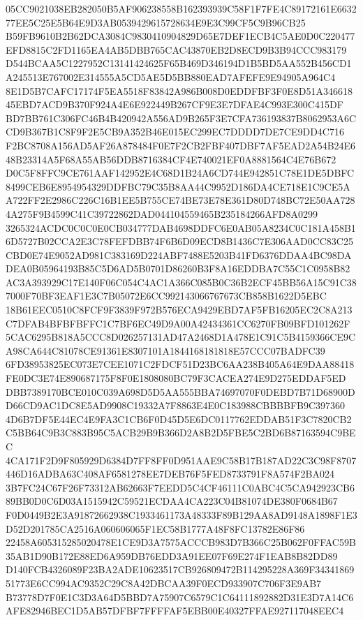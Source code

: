 \documentclass[UTF8,fontset=fandol,zihao=-4,a4paper]{ctexart}
\begin{document}
{{05CC9021038EB282050B5AF906238558B162393939C58F1F7FE4C89172161E663277EE5C25E5B64E9D3AB0539429615728634E9E3C99CF5C9B96CB25
B59FB9610B2B62DCA3084C9830410904829D65E7DEF1ECB4C5AE0D0C220477EFD8815C2FD1165EA4AB5DBB765CAC43870EB2D8ECD9B3B94CCC983179
D544BCAA5C1227952C13141424625F65B469D346194D1B5BD5AA552B456CD1A245513E767002E314555A5CD5AE5D5BB880EAD7AFEFE9E94905A964C4
8E1D5B7CAFC17174F5EA5518F83842A986B008D0EDDFBF3F0E8D51A34661845EBD7ACD9B370F924A4E6E922449B267CF9E3E7DFAE4C993E300C415DF
BD7BB761C306FC46B4B420942A556AD9B265F3E7CFA736193837B8062953A6CCD9B367B1C8F9F2E5CB9A352B46E015EC299EC7DDDD7DE7CE9DD4C716
F2BC8708A156AD5AF26A878484F0E7F2CB2FBF407DBF7AF5EAD2A54B24E648B23314A5F68A55AB56DDB8716384CF4E740021EF0A8881564C4E76B672
D0C5F8FFC9CE761AAF142952E4C68D1B24A6CD744E942851C78E1DE5DBFC8499CEB6E8954954329DDFBC79C35B8AA44C9952D186DA4CE718E1C9CE5A
A722FF2E2986C226C16B1EE5B755CE74BE73E78E361D80D748BC72E50AA7284A275F9B4599C41C39722862DAD044104559465B235184266AFD8A0299
3265324ACDC0C0C0E0CB034777DAB4698DDFC6E0AB05A8234C0C181A458B16D5727B02CCA2E3C78FEFDBB74F6B6D09ECD8B1436C7E306AAD0CC83C25
CBD0E74E9052AD981C383169D224ABF7488E5203B41FD6376DDAA4BC98DADEA0B05964193B85C5D6AD5B0701D86260B3F8A16EDDBA7C55C1C0958B82
AC3A393929C17E140F06C054C4AC1A366C085B0C36B2ECF45BB56A15C91C387000F70BF3EAF1E3C7B05072E6CC992143066767673CB858B1622D5EBC
18B61EEC0510C8FCF9F3839F972B576ECA9429EBD7AF5FB16205EC2C8A213C7DFAB4BFBFBFFC1C7BF6EC49D9A00A42434361CC6270FB09BFD101262F
5CAC6295B818A5CCC8D026257131AD47A2468D1A478E1C91C5B4159366CE9CA98CA644C81078CE91361E8307101A1844168181818E57CCC07BADFC39
6FD38953825EC073E7CEE1071C2FDCF51D23BC6AA238B405A64E9DAA88418FE0DC3E74E890687175F8F0E1808080BC79F3CACEA274E9D275EDDAF5ED
DBB7389170BCE010C039A698D5D5AA555BBA74697070F0DEBD7B71D68900DD66CD9AC1DC8E5AD9908C19332A7F8863E4E0C183988CBBBBFB9C397360
4D6B7DF5E44EC4E9FA3C1CB6F0D45D5E6DC0117762EDDAB51F3C7820CB2C5BB64C9B3C883B95C5ACB29B9B366D2A8B2D5FBE5C2BD6B87163594C9BEC
4CA171F2D9F805929D6384D7FF8FF0D951AAE9C58B17B187AD22C3C98F8707446D16ADBA63C408AF6581278EE7DEB76F5FED8733791F8A574F2BA024
3B7FC24C67F26F73312AB62663F7EEDD5C4CF46111C0ABC4C5CA942923CB689BB0D0C6D03A1515942C59521ECDAA4CA223C04B81074DE380F0684B67
F0D0449B2E3A91872662938C1933461173A48333F89B129AA8AD9148A1898F1E3D52D201785CA2516A060606065F1EC58B1777A48F8FC13782E86F86
22458A605315285020478E1CE9D3A7575ACCCB983D7B366C25B062F0FFAC59B35AB1D90B172E88ED6A959DB76EDD3A91EE07F69E274F1EAB8B82DD89
D140FCB4326089F23BA2ADE10623517CB926809472B114295228A369F3434186951773E6CC994AC9352C29C8A42DBCAA39F0ECD933907C706F3E9AB7
B73778D7F0E1C3D3A64D5BBD7A75907C6579C1C64111892882D31E3D7A14C6AFE82946BEC1D5AB57DFBF7FFFFAF5EBB00E40327FFAE927117048EEC4
}}
\end{document}
